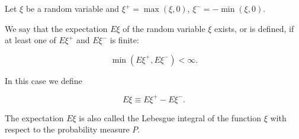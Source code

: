 Let $\xi$ be a random variable and $\xi^+ = \max(\xi, 0)$, $\xi^- = -\min(\xi, 0)$.

We say that the expectation $E\xi$ of the random variable $\xi$ exists, or is defined, if at least one of $E\xi^+$ and $E\xi^-$ is finite:

$$\min(E\xi^+, E\xi^-) < \infty.$$

In this case we define

$$E\xi \equiv E\xi^+ - E\xi^-.$$

The expectation $E\xi$ is also called the Lebesgue integral of the function $\xi$ with respect to the probability measure $P$.
